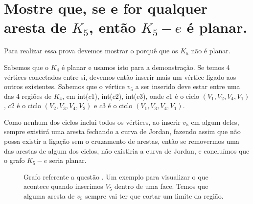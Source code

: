 \documentclass[a4paper,12pt]{article}
\begin{document}
\section{Mostre que, se e for qualquer aresta de $K_5$, então $K_5 - e$ é planar.}

	Para realizar essa prova devemos mostrar o porquê que os $K_5$ não é planar.

	Sabemos que o $K_4$ é planar e usamos isto para a demonstração. Se temos 4 vértices conectados entre si, devemos então inserir mais um vértice ligado aos outros existentes. Sabemos que o vértice $v_5$ a ser inserido deve estar entre uma das 4 regiões de $K_4$, em int($c1$), int($c2$), int($c3$), onde $c1$ é o ciclo $(V_1, V_2, V_4, V_1)$, $c2$ é o ciclo $(V_2, V_3, V_4, V_2)$ e $c3$ é o ciclo $(V_1, V_3, V_4, V_1)$.

	Como nenhum dos ciclos inclui todos os vértices, ao inserir $v_5$ em algum deles, sempre existirá uma aresta fechando a curva de Jordan, fazendo assim que não possa existir a ligação sem o cruzamento de arestas, então se removermos uma das arestas de algum dos ciclos, não existiria a curva de Jordan, e concluímos que o grafo $K_5 - e$ seria planar.

	\begin{figure}[!ht]
		\centering
		\caption{Grafo referente a questão \thesection. Um exemplo para visualizar o que acontece quando inserimos $V_5$ dentro de uma face. Temos que alguma aresta de $v_5$ sempre vai ter que cortar um limite da região.}
	\end{figure}
\end{document}
